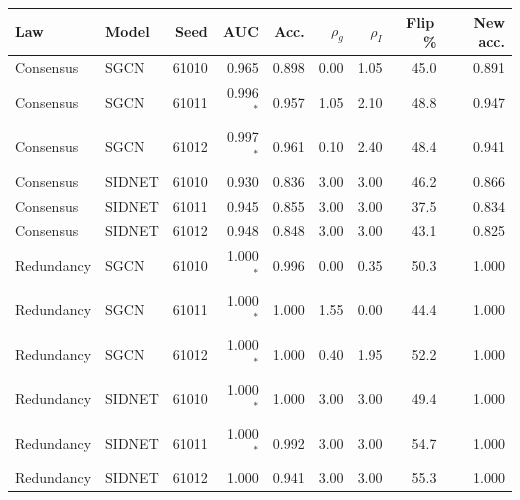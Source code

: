 \begin{tabular}{@{}llrrrrrrr@{}}
\toprule
Law & Model & Seed & AUC & Acc. & $\rho_g$ & $\rho_I$ & Flip\,\% & New acc. \\
\midrule
Consensus & SGCN & 61010 & 0.965 & 0.898 & 0.00 & 1.05 & 45.0 & 0.891 \\
Consensus & SGCN & 61011 & 0.996$^*$ & 0.957 & 1.05 & 2.10 & 48.8 & 0.947 \\
Consensus & SGCN & 61012 & 0.997$^*$ & 0.961 & 0.10 & 2.40 & 48.4 & 0.941 \\
Consensus & SIDNET & 61010 & 0.930 & 0.836 & 3.00 & 3.00 & 46.2 & 0.866 \\
Consensus & SIDNET & 61011 & 0.945 & 0.855 & 3.00 & 3.00 & 37.5 & 0.834 \\
Consensus & SIDNET & 61012 & 0.948 & 0.848 & 3.00 & 3.00 & 43.1 & 0.825 \\
Redundancy & SGCN & 61010 & 1.000$^*$ & 0.996 & 0.00 & 0.35 & 50.3 & 1.000 \\
Redundancy & SGCN & 61011 & 1.000$^*$ & 1.000 & 1.55 & 0.00 & 44.4 & 1.000 \\
Redundancy & SGCN & 61012 & 1.000$^*$ & 1.000 & 0.40 & 1.95 & 52.2 & 1.000 \\
Redundancy & SIDNET & 61010 & 1.000$^*$ & 1.000 & 3.00 & 3.00 & 49.4 & 1.000 \\
Redundancy & SIDNET & 61011 & 1.000$^*$ & 0.992 & 3.00 & 3.00 & 54.7 & 1.000 \\
Redundancy & SIDNET & 61012 & 1.000 & 0.941 & 3.00 & 3.00 & 55.3 & 1.000 \\
\bottomrule
\end{tabular}
